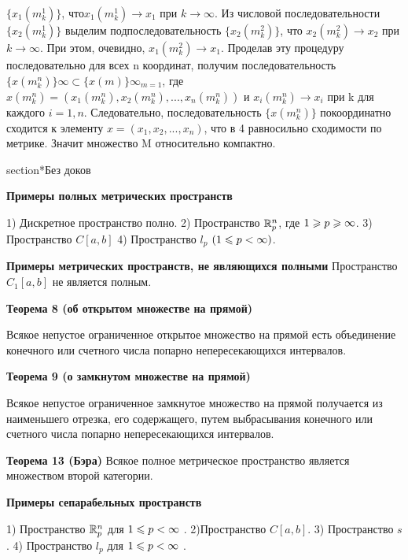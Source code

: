 {$\{x_1(m^1_k)\}$, что$ x_1(m^1_k) \to x_1$ при $k \to \infty$. Из числовой последовательности
$\{x_2(m^1_k)\}$ выделим подпоследовательность $\{x_2(m^2_k)\}$, что $x_2(m^2_k)  \to x_2$  при
$k \to \infty$. При этом, очевидно, $x_1(m^2_k) \to x_1$. 
Проделав эту процедуру последовательно для всех n координат, 
получим последовательность $\{x(m^n_k)\}\infty	\subset
\{x(m)\}\infty_{m=1}$,  где  $x(m^n_k)=(x_1(m^n_k), x_2(m^n_k), ..., 
x_n(m^n_k))$  
и  $x_i(m^n_k)   \to  x_i$  при
k  \to \infty для каждого $i  =  1, n$. Следовательно, последовательность $\{x(m^n_k)\}$
покоординатно сходится к элементу $x = (x_1, x_2, ..., x_n)$, что в 4 равносильно 
сходимости по метрике. Значит множество M относительно компактно.


section*{Без доков}

\textbf{Примеры полных метрических пространств  }


    1) Дискретное пространство полно.
    2) Пространство $\mathbb{R}^n_p$, где $1\geqslant p \geqslant \infty $.
    3) Пространство $C[a, b]$
    4) Пространство $l_p$ $(1 \leqslant  p < \infty )$.




\textbf{Примеры метрических пространств, не являющихся полными}
Пространство $C_1[a, b]$  не является полным.


\textbf{Теорема 8 (об открытом множестве на прямой) }

Всякое непустое ограниченное открытое множество на прямой есть объединение
конечного или счетного числа попарно непересекающихся интервалов.


\textbf{Теорема 9 (о замкнутом множестве на прямой)}

Всякое непустое ограниченное замкнутое множество на прямой
получается из наименьшего отрезка, его содержащего, путем выбрасывания конечного или
счетного числа попарно непересекающихся интервалов.


\textbf{Теорема 13 (Бэра)}
Всякое полное метрическое пространство является множеством второй категории.

\textbf{Примеры сепарабельных пространств}

    1) Пространство $\mathbb{R}^n_p$ для  $1\leqslant  p < \infty$ .
    2)Пространство  $C[a, b]$.
    3)	Пространство $s$.
    4)	Пространство $l_p$ для $1 \leqslant  p < \infty$ .


}
